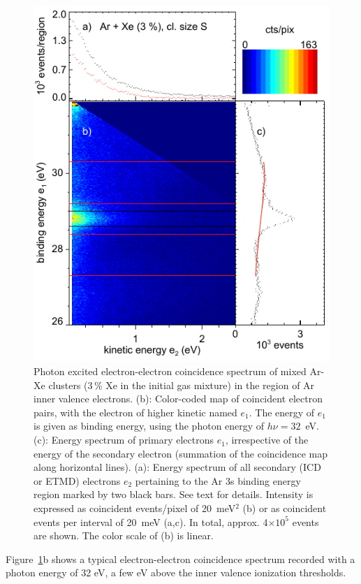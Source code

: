 \documentclass[journal=jpccck,manuscript=suppinfo]{achemso}
\begin{document}
\begin{figure}
 \centering
 \includegraphics[width=12cm]{pics/figure_map.pdf}
 \caption{
Photon excited electron-electron coincidence spectrum of mixed Ar-Xe clusters (3\,\% Xe in the initial gas mixture) in the region of Ar inner valence electrons. 
(b): Color-coded map of coincident electron pairs, with the electron of higher kinetic named $e_1$. 
The energy of $e_1$ is given as binding energy, using the photon energy of $h\nu = 32$~eV. 
(c): Energy spectrum of primary electrons $e_1$, irrespective of the energy of the secondary electron (summation of the coincidence map along horizontal lines). 
(a): Energy spectrum of all secondary (ICD or ETMD) electrons $e_2$ pertaining to the Ar 3s binding energy region marked by two black bars. 
See text for details. 
Intensity is expressed as coincident events/pixel of 20~meV$^2$ (b) or as coincident events per interval of 20~meV (a,c). 
In total, approx. 4$\times 10^5$ events are shown. 
The color scale of (b) is linear.
 \label{figure:map}
 }
\end{figure}
%
Figure\ \ref{figure:map}b shows a typical electron-electron coincidence spectrum recorded with a photon energy of 32 eV, a few eV above the inner valence ionization thresholds.
\end{document}

